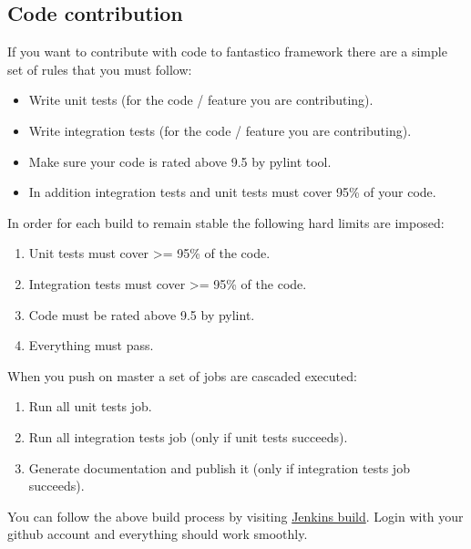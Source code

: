 \documentclass[letterpaper,10pt,english]{sphinxmanual}
\begin{document}
\subsection{Code contribution}
\label{get_started/contribute:code-contribution}
If you want to contribute with code to fantastico framework there are a simple set of rules that you must follow:
\begin{itemize}
\item {} 
Write unit tests (for the code / feature you are contributing).

\item {} 
Write integration tests (for the code / feature you are contributing).

\item {} 
Make sure your code is rated above 9.5 by pylint tool.

\item {} 
In addition integration tests and unit tests must cover 95\% of your code.

\end{itemize}

In order for each build to remain stable the following hard limits are imposed:
\begin{enumerate}
\item {} 
Unit tests must cover \textgreater{}= 95\% of the code.

\item {} 
Integration tests must cover \textgreater{}= 95\% of the code.

\item {} 
Code must be rated above 9.5 by pylint.

\item {} 
Everything must pass.

\end{enumerate}

When you push on master a set of jobs are cascaded executed:
\begin{enumerate}
\item {} 
Run all unit tests job.

\item {} 
Run all integration tests job (only if unit tests succeeds).

\item {} 
Generate documentation and publish it (only if integration tests job succeeds).

\end{enumerate}

You can follow the above build process by visiting
\href{http://jenkins.scrum-expert.ro:8080/job/fantastico-framework/}{Jenkins build}. Login with your github account and everything
should work smoothly.
\end{document}
